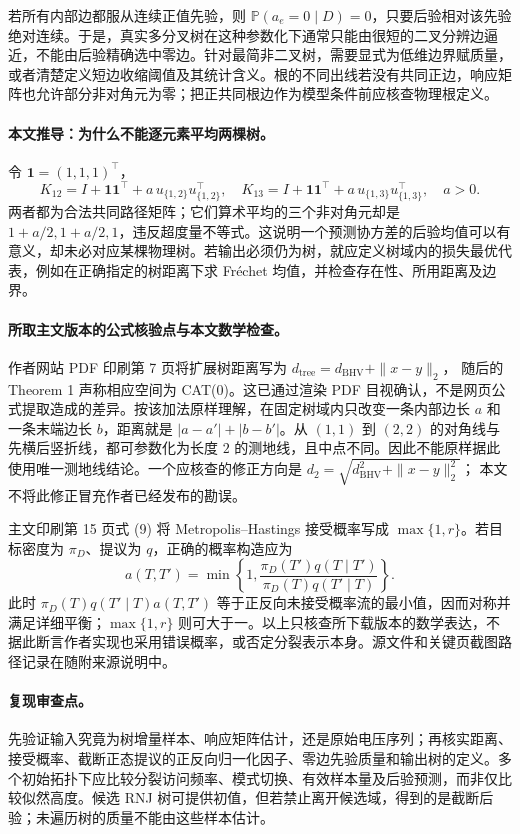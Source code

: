 若所有内部边都服从连续正值先验，则
$\mathbb P(a_e=0\mid D)=0$，只要后验相对该先验绝对连续。于是，真实多分叉树在这种参数化下通常只能由很短的二叉分辨边逼近，不能由后验精确选中零边。针对最简非二叉树，需要显式为低维边界赋质量，或者清楚定义短边收缩阈值及其统计含义。根的不同出线若没有共同正边，响应矩阵也允许部分非对角元为零；把正共同根边作为模型条件前应核查物理根定义。

\paragraph{本文推导：为什么不能逐元素平均两棵树。}
令 $\mathbf1=(1,1,1)^\top$，
\[
 K_{12}=I+\mathbf1\mathbf1^\top+a\,u_{\{1,2\}}u_{\{1,2\}}^\top,\quad
 K_{13}=I+\mathbf1\mathbf1^\top+a\,u_{\{1,3\}}u_{\{1,3\}}^\top,\quad a>0.
\]
两者都为合法共同路径矩阵；它们算术平均的三个非对角元却是
$1+a/2,1+a/2,1$，违反超度量不等式。这说明一个预测协方差的后验均值可以有意义，却未必对应某棵物理树。若输出必须仍为树，就应定义树域内的损失最优代表，例如在正确指定的树距离下求 Fr\'echet 均值，并检查存在性、所用距离及边界。

\paragraph{所取主文版本的公式核验点与本文数学检查。}
作者网站 PDF 印刷第 7 页将扩展树距离写为
$d_{\mathrm{tree}}=d_{\mathrm{BHV}}+\|x-y\|_2$，
随后的 Theorem 1 声称相应空间为 CAT(0)。这已通过渲染 PDF 目视确认，不是网页公式提取造成的差异。按该加法原样理解，在固定树域内只改变一条内部边长 $a$ 和一条末端边长 $b$，距离就是 $|a-a'|+|b-b'|$。从 $(1,1)$ 到 $(2,2)$ 的对角线与先横后竖折线，都可参数化为长度 $2$ 的测地线，且中点不同。因此不能原样据此使用唯一测地线结论。一个应核查的修正方向是
$d_2=\sqrt{d_{\mathrm{BHV}}^2+\|x-y\|_2^2}$；
本文不将此修正冒充作者已经发布的勘误。

主文印刷第 15 页式 (9) 将 Metropolis--Hastings 接受概率写成
$\max\{1,r\}$。若目标密度为 $\pi_D$、提议为 $q$，正确的概率构造应为
\[
 a(T,T')=\min\!\left\{1,
 \frac{\pi_D(T')q(T\mid T')}{\pi_D(T)q(T'\mid T)}\right\}.
\]
此时 $\pi_D(T)q(T'\mid T)a(T,T')$ 等于正反向未接受概率流的最小值，因而对称并满足详细平衡；$\max\{1,r\}$ 则可大于一。以上只核查所下载版本的数学表达，不据此断言作者实现也采用错误概率，或否定分裂表示本身。源文件和关键页截图路径记录在随附来源说明中。

\paragraph{复现审查点。}
先验证输入究竟为树增量样本、响应矩阵估计，还是原始电压序列；再核实距离、接受概率、截断正态提议的正反向归一化因子、零边先验质量和输出树的定义。多个初始拓扑下应比较分裂访问频率、模式切换、有效样本量及后验预测，而非仅比较似然高度。候选 RNJ 树可提供初值，但若禁止离开候选域，得到的是截断后验；未遍历树的质量不能由这些样本估计。


